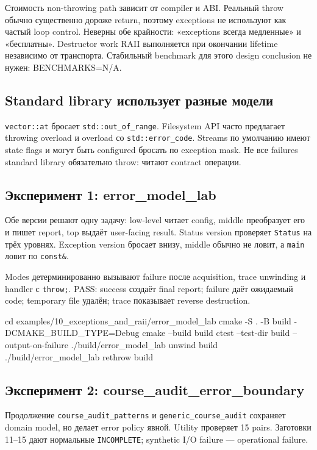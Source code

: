 Стоимость non-throwing path зависит от compiler и ABI. Реальный throw обычно
существенно дороже return, поэтому exceptions не используют как частый loop
control. Неверны обе крайности: «exceptions всегда медленные» и «бесплатны».
Destructor work RAII выполняется при окончании lifetime независимо от транспорта.
Стабильный benchmark для этого design conclusion не нужен: BENCHMARKS=N/A.

\subsection{Standard library использует разные модели}

\texttt{vector::at} бросает \texttt{std::out\_of\_range}. Filesystem API часто
предлагает throwing overload и overload со \texttt{std::error\_code}. Streams по
умолчанию имеют state flags и могут быть configured бросать по exception mask.
Не все failures standard library обязательно throw: читают contract операции.

\subsection{Эксперимент 1: error\_model\_lab}

Обе версии решают одну задачу: low-level читает config, middle преобразует его и
пишет report, top выдаёт user-facing result. Status version проверяет
\texttt{Status} на трёх уровнях. Exception version бросает внизу, middle обычно
не ловит, а \texttt{main} ловит по \texttt{const\&}.

Modes детерминированно вызывают failure после acquisition, trace unwinding и
handler с \texttt{throw;}. PASS: success создаёт final report; failure даёт
ожидаемый code; temporary file удалён; trace показывает reverse destruction.

\begin{shellcode}
cd examples/10_exceptions_and_raii/error_model_lab
cmake -S . -B build -DCMAKE_BUILD_TYPE=Debug
cmake --build build
ctest --test-dir build --output-on-failure
./build/error_model_lab unwind build
./build/error_model_lab rethrow build
\end{shellcode}

\subsection{Эксперимент 2: course\_audit\_error\_boundary}

Продолжение \texttt{course\_audit\_patterns} и
\texttt{generic\_course\_audit} сохраняет domain model, но делает error policy
явной. Utility проверяет 15 pairs. Заготовки 11--15 дают нормальные
\texttt{INCOMPLETE}; synthetic I/O failure --- operational failure.

